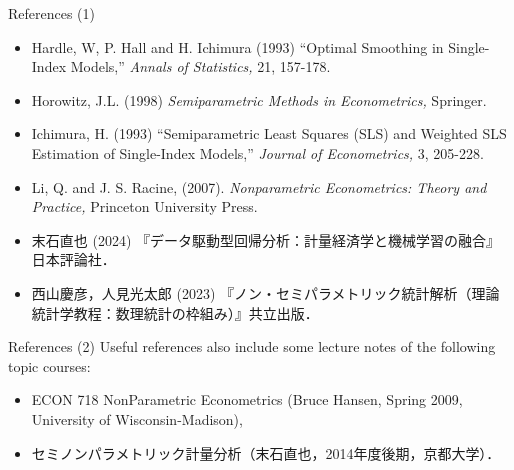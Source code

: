 \documentclass[xcolor=svgnames,dvipdfmx,cjk]{beamer}
\theoremstyle{example}
\begin{document}
\begin{frame}{References (1)}
  \begin{itemize}
    \item Hardle, W, P. Hall and H. Ichimura (1993)
          ``Optimal Smoothing in Single-Index Models,'' \textit{Annals of Statistics,} 21, 157-178.
    \item Horowitz, J.L. (1998)
          \textit{Semiparametric Methods in Econometrics,}
          Springer.
    \item Ichimura, H. (1993) 
          ``Semiparametric Least Squares (SLS) and Weighted SLS Estimation of Single-Index Models,''
          \textit{Journal of Econometrics,} 3, 205-228. 
    \item Li, Q. and J. S. Racine, (2007). 
          \textit{Nonparametric Econometrics: Theory and Practice,} 
          Princeton University Press.
    \item 末石直也 (2024) 『データ駆動型回帰分析：計量経済学と機械学習の融合』日本評論社．
    \item 西山慶彦，人見光太郎 (2023) 『ノン・セミパラメトリック統計解析（理論統計学教程：数理統計の枠組み）』共立出版．
  \end{itemize}
\end{frame}

\begin{frame}{References (2)}
\quad 
Useful references also include some lecture notes of the following topic courses:
  \begin{itemize}
    \item ECON 718 NonParametric Econometrics (Bruce Hansen, Spring 2009, University of Wisconsin-Madison),
    \item セミノンパラメトリック計量分析（末石直也，2014年度後期，京都大学）．
  \end{itemize}
\end{frame}
\end{document}

